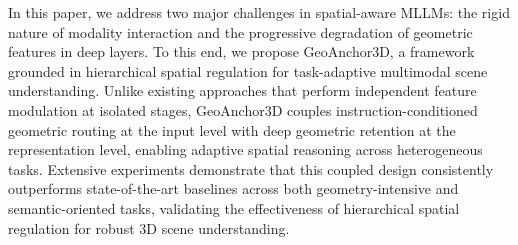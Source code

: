 \documentclass[lettersize,journal]{IEEEtran}
\begin{document}
In this paper, {we address two major challenges in spatial-aware MLLMs: the rigid nature of modality interaction and the progressive degradation of geometric features in deep layers. To this end, we propose GeoAnchor3D}, a framework grounded in {hierarchical spatial regulation for task-adaptive multimodal scene understanding. Unlike existing approaches that perform independent feature modulation at isolated stages, GeoAnchor3D couples instruction-conditioned geometric routing at the input level with deep geometric retention at the representation level, enabling adaptive spatial reasoning across heterogeneous tasks.} Extensive experiments demonstrate that this coupled design consistently outperforms state-of-the-art baselines across both geometry-intensive and semantic-oriented tasks, validating the effectiveness of hierarchical spatial regulation for robust 3D scene understanding.



\end{document}
